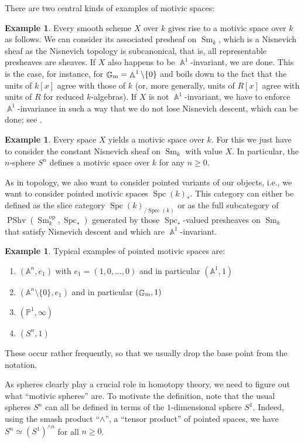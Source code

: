 \documentclass[english]{amsart}
\theoremstyle{definition}
\newtheorem{ex}[prop]{Example}
\DeclareMathOperator{\A}{\mathbb{A}}
\DeclareMathOperator{\G}{\mathbb{G}}
\DeclareMathOperator{\op}{op}
\DeclareMathOperator{\Spc}{Spc}
\DeclareMathOperator{\Sm}{Sm}
\DeclareMathOperator{\Spec}{Spec}
\DeclareMathOperator{\PShv}{PShv}
\begin{document}
There are two central kinds of examples of motivic spaces:
\begin{ex}
Every smooth scheme $X$ over $k$ gives rise to a motivic space over $k$ as follows. We can consider its associated presheaf on $\Sm_k$, which is a Nisnevich sheaf as the Nisnevich topology is subcanonical, that is, all representable presheaves are sheaves. If $X$ also happens to be $\A^1$-invariant, we are done. This is the case, for instance, for $\G_{\rm m} = \A^1 \setminus \lbrace 0 \rbrace$ and boils down to the fact that the units of $k[x]$ agree with those of $k$ (or, more generally, units of $R[x]$ agree with units of $R$ for reduced $k$-algebras). If $X$ is not $\A^1$-invariant, we have to enforce $\A^1$-invariance in such a way that we do not lose Nisnevich descent, which can be done; see \cite{MR3727503}. 
\end{ex}
\begin{ex}
Every space $X$ yields a motivic space over $k$. For this we just have to consider the constant Nisnevich sheaf on $\Sm_k$ with value $X$. In particular, the $n$-sphere $S^n$ defines a motivic space over $k$ for any $n \geq 0$.
\end{ex}
As in topology, we also want to consider pointed variants of our objects, i.e., we want to consider pointed motivic spaces $\Spc(k)_*$. This category can either be defined as the slice category $\Spc(k)_{/ \Spec(k)}$ or as the full subcategory of $\PShv(\Sm_k^{\op},\Spc_*)$ generated by those $\Spc_*$-valued presheaves on $\Sm_k$ that satisfy Nisnevich descent and which are $\A^1$-invariant. 
\begin{ex}
Typical examples of pointed motivic spaces are: 
\begin{enumerate}
\item[$\bullet$] $(\mathbb{A}^n,e_1)$ with $e_1 = (1,0,\dotsc,0)$ and in particular $(\mathbb{A}^1,1)$
\item[$\bullet$] $(\mathbb{A}^n \setminus \lbrace 0 \rbrace,e_1)$ and in particular $(\G_{\rm m},1)$
\item[$\bullet$] $(\mathbb{P}^1,\infty)$
\item[$\bullet$] $(S^n,1)$
\end{enumerate}
These occur rather frequently, so that we usually drop the base point from the notation. 
\end{ex}

As spheres clearly play a crucial role in homotopy theory, we need to figure out what ``motivic spheres'' are. To motivate the definition, note that the usual spheres $S^n$ can all be defined in terms of the $1$-dimensional sphere $S^1$. Indeed, using the smash product ``$\wedge$'', a ``tensor product'' of pointed spaces, we have $S^n \simeq (S^1)^{\wedge n}$ for all $n \geq 0$. 
\end{document}
